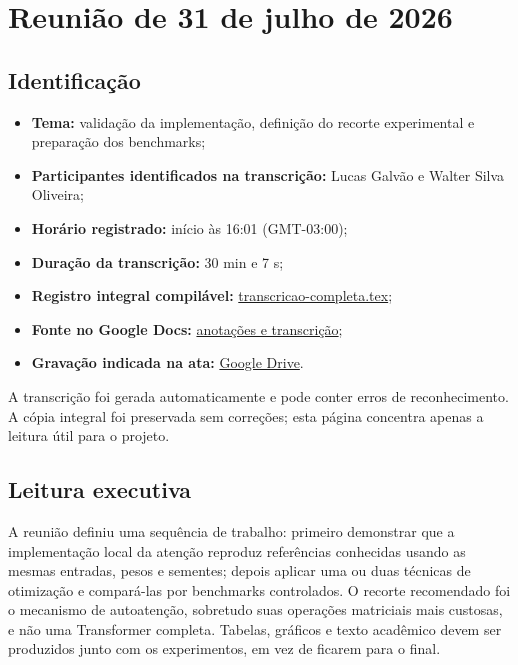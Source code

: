 

\chapter{Reunião de 31 de julho de 2026}



\section{Identificação}


\begin{itemize}
\item \textbf{Tema:} validação da implementação, definição do recorte experimental e
preparação dos benchmarks;
\item \textbf{Participantes identificados na transcrição:} Lucas Galvão e Walter Silva
Oliveira;
\item \textbf{Horário registrado:} início às 16:01 (GMT-03:00);
\item \textbf{Duração da transcrição:} 30 min e 7 s;
\item \textbf{Registro integral compilável:} \href{transcricao-completa.tex}{transcricao-completa.tex};
\item \textbf{Fonte no Google Docs:} \href{https://docs.google.com/document/d/1WBgwj1gDAWh_7VGckHvPhRfSlcRzFIwL2JlnIDhRYbQ/edit?usp=drive_web&tab=t.v1ze8hoqd423}{anotações e transcrição};
\item \textbf{Gravação indicada na ata:} \href{https://drive.google.com/file/d/1-FFyxhkpgkhlesSqULSIaujRSiDnT1UN/view?usp=drive_web}{Google Drive}.
\end{itemize}




A transcrição foi gerada automaticamente e pode conter erros de reconhecimento. A cópia integral foi preservada sem correções; esta página concentra apenas a leitura útil para o projeto.



\section{Leitura executiva}









A reunião definiu uma sequência de trabalho: primeiro demonstrar que a implementação local da atenção reproduz referências conhecidas usando as mesmas entradas, pesos e sementes; depois aplicar uma ou duas técnicas de otimização e compará-las por benchmarks controlados. O recorte recomendado foi o mecanismo de autoatenção, sobretudo suas operações matriciais mais custosas, e não uma Transformer completa. Tabelas, gráficos e texto acadêmico devem ser produzidos junto com os experimentos, em vez de ficarem para o final.



